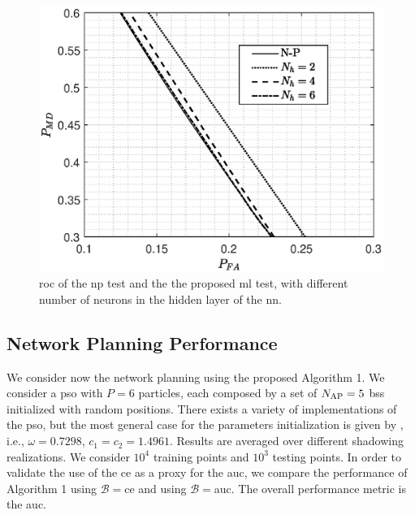 \documentclass[conference,final]{IEEEtran}
\begin{document}
 
 \begin{figure}[h]
     \centering
     \includegraphics[width=0.9\columnwidth]{FA_MD_LOS.eps}
     \caption{\ac{roc} of the \ac{np} test and the the proposed \ac{ml} test,  with different number of neurons in the hidden layer of the \ac{nn}.}
     \label{fig:NP_comp}
 \end{figure}







\subsection{Network Planning Performance}

We consider now the network planning using the proposed Algorithm 1. We consider a \ac{pso} with $P=6$ particles, each composed by a set of $N_{\rm AP}=5$ \acp{bs} initialized with random positions. There exists a variety of implementations of the \ac{pso}, but the most general case for the parameters initialization is given by \cite{clerc2002}, i.e.,   $\omega=0.7298$, $c_1=c_2=1.4961$. Results are averaged over different shadowing realizations. We consider $10^4$ training  points and  $10^3$ testing points. In order to validate the use of the \ac{ce} as a proxy for the \ac{auc}, we compare the performance of Algorithm 1 using $\mathcal{B}=$\ac{ce} and using $\mathcal{B}=$\ac{auc}. The overall performance metric is the \ac{auc}.
\end{document}
